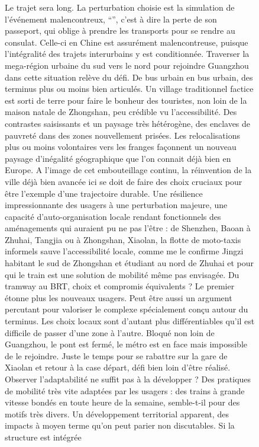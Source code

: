 \begin{figure}[h!]
\begin{mdframed}
\medskip


\end{mdframed}
\end{figure}




\begin{figure}[h!]
\begin{mdframed}
Le trajet sera long. La perturbation choisie est la simulation de l'événement malencontreux, ``'', c'est à dire la perte de son passeport, qui oblige à prendre les transports pour se rendre au consulat. Celle-ci en Chine est assurément malencontreuse, puisque l'intégralité des trajets interurbains y est conditionnée. Traverser la mega-région urbaine du sud vers le nord pour rejoindre Guangzhou dans cette situation relève du défi. De bus urbain en bus urbain, des terminus plus ou moins bien articulés. Un village traditionnel factice est sorti de terre pour faire le bonheur des touristes, non loin de la maison natale de Zhongshan, peu crédible vu l'accessibilité. Des contrastes saisissants et un paysage très hétérogène, des enclaves de pauvreté dans des zones nouvellement prisées. Les relocalisations plus ou moins volontaires vers les franges façonnent un nouveau paysage d'inégalité géographique que l'on connait déjà bien en Europe. A l'image de cet embouteillage continu, la réinvention de la ville déjà bien avancée ici se doit de faire des choix cruciaux pour être l'exemple d'une trajectoire durable. Une résilience impressionnante des usagers à une perturbation majeure, une capacité d'auto-organisation locale rendant fonctionnels des aménagements qui auraient pu ne pas l'être : de Shenzhen, Baoan à Zhuhai, Tangjia ou à Zhongshan, Xiaolan, la flotte de moto-taxis informels sauve l'accessibilité locale, comme me le confirme Jingzi habitant le sud de Zhongshan et étudiant au nord de Zhuhai et pour qui le train est une solution de mobilité même pas envisagée. Du tramway au BRT, choix et compromis équivalents ? Le premier étonne plus les nouveaux usagers. Peut être aussi un argument percutant pour valoriser le complexe spécialement conçu autour du terminus. Les choix locaux sont d'autant plus différentiables qu'il est difficile de passer d'une zone à l'autre. Bloqué non loin de Guangzhou, le pont est fermé, le métro est en face mais impossible de le rejoindre. Juste le temps pour se rabattre sur la gare de Xiaolan et retour à la case départ, défi bien loin d'être réalisé. Observer l'adaptabilité ne suffit pas à la développer ? Des pratiques de mobilité très vite adaptées par les usagers : des trains à grande vitesse bondés en toute heure de la semaine, semble-t-il pour des motifs très divers. Un développement territorial apparent, des impacts à moyen terme qu'on peut parier non discutables. Si la structure est intégrée 
\end{mdframed}
\end{figure}
